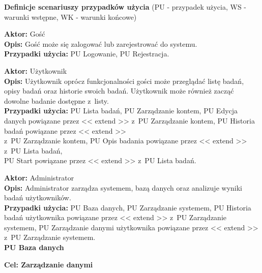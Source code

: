 \documentclass[12pt, letterpaper]{article}
\begin{document}
		\textbf{Definicje scenariuszy przypadków użycia} (PU - przypadek użycia, WS - warunki wstępne, WK - warunki końcowe)\\
		
		\quad		
		
		\textbf{Aktor:} Gość\\
		
		\textbf{Opis:} Gość może się zalogować lub zarejestrować do systemu.\\
		
		\textbf{Przypadki użycia:} PU Logowanie, PU Rejestracja.
		
		\vspace{1cm}
		
		\textbf{Aktor:} Użytkownik\\
		
		\textbf{Opis:} Użytkownik oprócz funkcjonalności gości może przeglądać listę badań, opisy badań oraz historie swoich badań. Użytkownik może również zacząć dowolne badanie dostępne z~listy.\\
		
		\textbf{Przypadki użycia:} PU Lista badań, PU Zarządzanie kontem, PU Edycja danych powiązane przez << extend >> z~PU Zarządzanie kontem, PU Historia badań powiązane przez << extend >>\\ z~PU Zarządzanie kontem, PU Opis badania powiązane przez << extend >> z~PU Lista badań,\\ PU Start powiązane przez << extend >> z~PU Lista badań. 
		
		\vspace{1cm}
		
		\textbf{Aktor:} Administrator\\
		
		\textbf{Opis:} Administrator zarządza systemem, bazą danych oraz analizuje wyniki badań użytkowników.\\
		
		\textbf{Przypadki użycia:} PU Baza danych, PU Zarządzanie systemem, PU Historia badań użytkownika powiązane przez << extend >> z~PU Zarządzanie systemem, PU Zarządzanie danymi użytkownika powiązane przez << extend >> z~PU Zarządzanie systemem.\\
		
		
		\textbf{PU Baza danych}
		
		\quad
		
		\textbf{Cel: Zarządzanie danymi}\\
		
\end{document}
